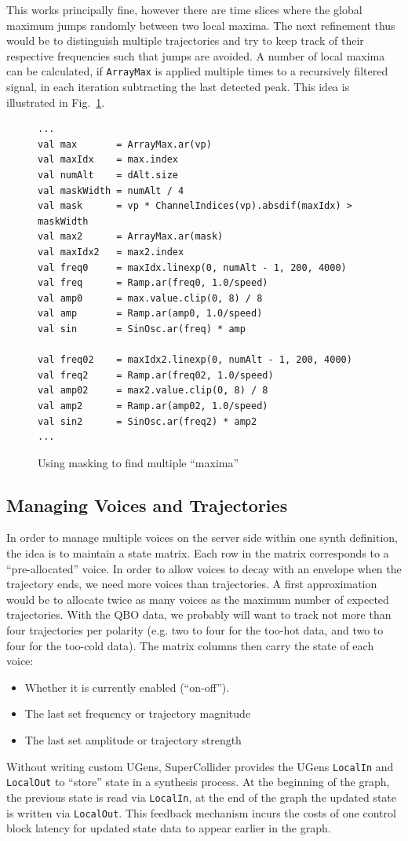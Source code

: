 \documentclass[11pt,a4paper]{article}
\newcommand{\figref}[1]{Fig.~\ref{#1}}
\begin{document}
This works principally fine, however there are time slices where the global maximum jumps randomly between two local maxima. The next refinement thus would be to distinguish multiple trajectories and try to keep track of their respective frequencies such that jumps are avoided. A number of local maxima can be calculated, if \Verb!ArrayMax! is applied multiple times to a recursively filtered signal, in each iteration subtracting the last detected peak. This idea is illustrated in \figref{fig:sonif-multi-max}.

\begin{figure}
\begin{lstlisting}[style=scala]
...
val max       = ArrayMax.ar(vp)
val maxIdx    = max.index
val numAlt    = dAlt.size
val maskWidth = numAlt / 4
val mask      = vp * ChannelIndices(vp).absdif(maxIdx) > maskWidth
val max2      = ArrayMax.ar(mask)
val maxIdx2   = max2.index
val freq0     = maxIdx.linexp(0, numAlt - 1, 200, 4000)
val freq      = Ramp.ar(freq0, 1.0/speed)
val amp0      = max.value.clip(0, 8) / 8
val amp       = Ramp.ar(amp0, 1.0/speed)
val sin       = SinOsc.ar(freq) * amp

val freq02    = maxIdx2.linexp(0, numAlt - 1, 200, 4000)
val freq2     = Ramp.ar(freq02, 1.0/speed)
val amp02     = max2.value.clip(0, 8) / 8
val amp2      = Ramp.ar(amp02, 1.0/speed)
val sin2      = SinOsc.ar(freq2) * amp2
...
\end{lstlisting}
\caption{Using masking to find multiple ``maxima''}
\label{fig:sonif-multi-max}
\end{figure}

\subsection{Managing Voices and Trajectories}

In order to manage multiple voices on the server side within one synth definition, the idea is to maintain a state matrix. Each row in the matrix corresponds to a ``pre-allocated'' voice. In order to allow voices to decay with an envelope when the trajectory ends, we need more voices than trajectories. A first approximation would be to allocate twice as many voices as the maximum number of expected trajectories. With the QBO data, we probably will want to track not more than four trajectories per polarity (e.g. two to four for the too-hot data, and two to four for the too-cold data). The matrix columns then carry the state of each voice:
%
\begin{itemize}
\item Whether it is currently enabled (``on-off'').
\item The last set frequency or trajectory magnitude
\item The last set amplitude or trajectory strength
\end{itemize}
%
Without writing custom UGens, SuperCollider provides the UGens \Verb!LocalIn! and \Verb!LocalOut! to ``store'' state in a synthesis process. At the beginning of the graph, the previous state is read via \Verb!LocalIn!, at the end of the graph the updated state is written via \Verb!LocalOut!. This feedback mechanism incurs the costs of one control block latency for updated state data to appear earlier in the graph.
\end{document}
